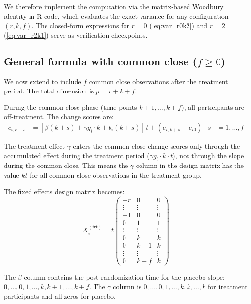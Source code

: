 \documentclass[
]{article}
\begin{document}
We therefore implement the computation via the matrix-based Woodbury
identity in R code, which evaluates the exact variance for any
configuration \((r, k, f)\). The closed-form expressions for \(r=0\)
(\ref{eq:var_r0k2}) and \(r=2\) (\ref{eq:var_r2k1}) serve as
verification checkpoints.

\subsection{\texorpdfstring{General formula with common close
(\(f \ge 0\))}{General formula with common close (f \textbackslash ge 0)}}\label{general-formula-with-common-close-f-ge-0}

We now extend to include \(f\) common close observations after the
treatment period. The total dimension is \(p = r + k + f\).

During the common close phase (time points \(k+1, \ldots,
k+f\)), all participants are off-treatment. The change scores are:
\begin{align}
  c_{i,k+s} &= [\beta(k+s) + \gamma g_i \cdot k + b_i(k+s)]
    \,t + (e_{i,k+s} - e_{i0})
    & s &= 1,\ldots,f
\end{align}

The treatment effect \(\gamma\) enters the common close change scores
only through the accumulated effect during the treatment period
(\(\gamma g_i \cdot k \cdot t\)), not through the slope during the
common close. This means the \(\gamma\) column in the design matrix has
the value \(kt\) for all common close observations in the treatment
group.

The fixed effects design matrix becomes: \[
  X_i^{(\text{trt})} = t\begin{pmatrix}
    -r   & 0 & 0 \\
    \vdots & \vdots & \vdots \\
    -1   & 0 & 0 \\
    0    & 1 & 1 \\
    \vdots & \vdots & \vdots \\
    0    & k & k \\
    0    & k+1 & k \\
    \vdots & \vdots & \vdots \\
    0    & k+f & k
  \end{pmatrix}
\]

The \(\beta\) column contains the post-randomization time for the
placebo slope: \(0,\ldots,0,1,\ldots,k,k+1,\ldots,k+f\). The \(\gamma\)
column is \(0,\ldots,0,1,\ldots,k,k,\ldots,k\) for treatment
participants and all zeros for placebo.
\end{document}
